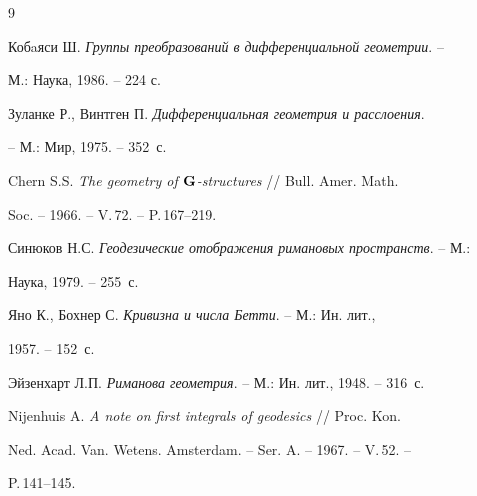 \begin{thebibliography}{9}


Кобaяси Ш. {\em Группы преобразований в дифференциальной геометрии}. -- 


М.: Наука, 1986. -- 224 с. 




Зуланке Р., Винтген П. {\em Дифференциальная геометрия и расслоения}. 


-- М.: Мир, 1975. -- 352~с. 




Chern S.S. {\em The geometry of $\bold G$-structures} // Bull. Amer. Math. 


Soc. -- 1966. -- V.\,72. -- P.\,167--219. 




Синюков Н.С. {\em Геодезические отображения римановых пространств}. -- М.: 


Наука, 1979. -- 255~с. 




Яно К., Бохнер С. {\em Кривизна и числа Бетти}. -- М.: Ин. лит., 


1957. -- 152~с. 




Эйзенхарт Л.П. {\em Риманова геометрия}. -- М.: Ин. лит., 1948. -- 316~с. 




Nijenhuis A. {\em A note on first integrals of geodesics} // Proc. Kon. 


Ned. Acad. Van. Wetens. Amsterdam. -- Ser. A. -- 1967. -- V.\,52. -- 


P.\,141--145. 


 


\end{thebibliography} 


 


\vskip 0.5cm 


 






 


\label{end} 


 


